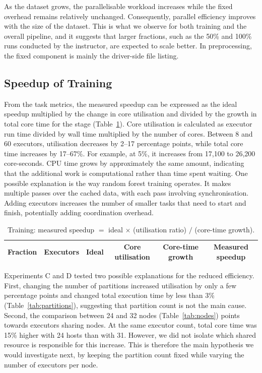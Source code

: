 \documentclass[a4paper, 11pt]{article} %
\begin{document}
As the dataset grows, the parallelisable workload increases while the fixed overhead remains relatively unchanged. Consequently, parallel efficiency improves with the size of the dataset. This is what we observe for both training and the overall pipeline, and it suggests that larger fractions, such as the 50\% and 100\% runs conducted by the instructor, are expected to scale better. In preprocessing, the fixed component is mainly the driver-side file listing.

\subsection{Speedup of Training}
From the task metrics, the measured speedup can be expressed as the ideal speedup multiplied by the change in core utilisation and divided by the growth in total core time for the stage (Table~\ref{tab:work}). Core utilisation is calculated as executor run time divided by wall time multiplied by the number of cores. Between 8 and 60 executors, utilisation decreases by 2--17 percentage points, while total core time increases by 17--67\%. For example, at 5\%, it increases from 17,100 to 26,200 core-seconds. CPU time grows by approximately the same amount, indicating that the additional work is computational rather than time spent waiting. One possible explanation is the way random forest training operates. It makes multiple passes over the cached data, with each pass involving synchronisation. Adding executors increases the number of smaller tasks that need to start and finish, potentially adding coordination overhead.

\begin{table}[H]
\centering
\footnotesize
\begin{tabular}{@{}llrccc@{}}
\hline
Fraction & Executors & Ideal & Core utilisation & Core-time growth & Measured speedup \\
\hline

\end{tabular}
\caption{Training: measured speedup $=$ ideal $\times$ (utilisation ratio) $/$ (core-time growth).}
\label{tab:work}
\end{table}

Experiments C and D tested two possible explanations for the reduced efficiency. First, changing the number of partitions increased utilisation by only a few percentage points and changed total execution time by less than 3\% (Table~\ref{tab:partitions}), suggesting that partition count is not the main cause. Second, the comparison between 24 and 32 nodes (Table~\ref{tab:nodes}) points towards executors sharing nodes. At the same executor count, total core time was 15\% higher with 24 hosts than with 31. However, we did not isolate which shared resource is responsible for this increase. This is therefore the main hypothesis we would investigate next, by keeping the partition count fixed while varying the number of executors per node.
\end{document}
